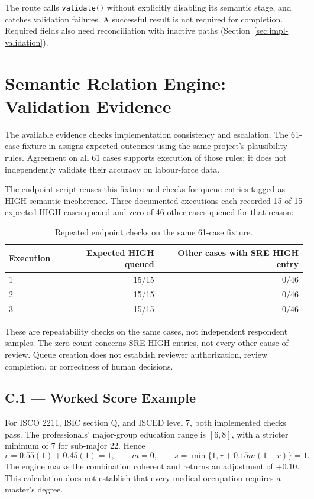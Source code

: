 The route calls \texttt{validate()} without explicitly disabling its
semantic stage, and catches validation failures. A successful result is
not required for completion. Required fields also need reconciliation
with inactive paths (Section~\ref{sec:impl-validation}).

\chapter{Semantic Relation Engine: Validation Evidence}
\label{app:sre-demo}

The available evidence checks implementation consistency and escalation.
The 61-case fixture in  assigns
expected outcomes using the same project's plausibility rules. Agreement
on all 61 cases supports execution of those rules; it does not
independently validate their accuracy on labour-force data.

The endpoint script reuses this fixture and checks for queue entries
tagged as HIGH semantic incoherence. Three documented executions each
recorded 15 of 15 expected HIGH cases queued and zero of 46 other cases
queued for that reason:
\begin{table}[htbp]
\centering
\caption{Repeated endpoint checks on the same 61-case fixture.}
\label{tab:app-sre-runs}
\begin{tabular}{@{}l r r@{}}
\toprule
\textbf{Execution} & \textbf{Expected HIGH queued} &
\textbf{Other cases with SRE HIGH entry} \\
\midrule
1 & 15/15 & 0/46 \\
2 & 15/15 & 0/46 \\
3 & 15/15 & 0/46 \\
\bottomrule
\end{tabular}
\end{table}

These are repeatability checks on the same cases, not independent
respondent samples. The zero count concerns SRE HIGH entries, not every
other cause of review. Queue creation does not establish reviewer
authorization, review completion, or correctness of human decisions.

\section*{C.1 --- Worked Score Example}

For ISCO 2211, ISIC section Q, and ISCED level 7, both implemented checks
pass. The professionals' major-group education range is $[6,8]$, with a
stricter minimum of 7 for sub-major 22. Hence
\[
  r=0.55(1)+0.45(1)=1,\qquad m=0,\qquad
  s=\min\{1,r+0.15m(1-r)\}=1.
\]
The engine marks the combination coherent and returns an adjustment of
$+0.10$. This calculation does not establish that every medical occupation
requires a master's degree.

